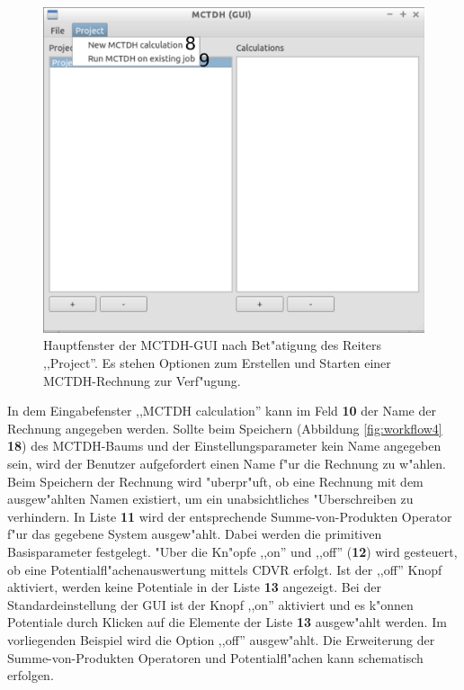 \begin{figure}
    \centering
    \includegraphics[scale=0.5]{figures/screenMainProject}
    \caption{Hauptfenster der MCTDH-GUI nach Bet"atigung des Reiters ,,Project''. Es stehen Optionen zum Erstellen und Starten einer
    MCTDH-Rechnung zur Verf"ugung.}\label{fig:workflow3}
\end{figure}

In dem Eingabefenster ,,MCTDH calculation'' kann im Feld \textbf{10} der Name der Rechnung angegeben werden. 
Sollte beim Speichern (Abbildung \ref{fig:workflow4} \textbf{18}) des MCTDH-Baums und der Einstellungsparameter 
kein Name angegeben sein, wird der Benutzer 
aufgefordert einen Name f"ur die Rechnung zu w"ahlen. 
Beim Speichern der Rechnung wird "uberpr"uft, ob eine Rechnung mit dem ausgew"ahlten Namen existiert,
um ein unabsichtliches "Uberschreiben zu verhindern.
In Liste \textbf{11} wird der entsprech\-ende Summe-von-Produkten Operator f"ur das gegebene System ausgew"ahlt.
Dabei werden die primitiven Basisparameter festgelegt.
"Uber die Kn"opfe  ,,on'' und ,,off'' (\textbf{12}) wird gesteuert, ob eine Potentialfl"achenauswertung mittels 
CDVR erfolgt.
Ist der ,,off'' Knopf aktiviert, werden keine Potentiale in der Liste \textbf{13} angezeigt.
Bei der Standardeinstellung der GUI ist der Knopf ,,on'' aktiviert und es k"onnen Potentiale durch Klicken
auf die Elemente der Liste \textbf{13} ausgew"ahlt werden. Im vorliegenden Beispiel wird die Option ,,off''
ausgew"ahlt.
Die Erweiterung der Summe-von-Produkten Operatoren und Potentialfl"achen kann schematisch erfolgen.


